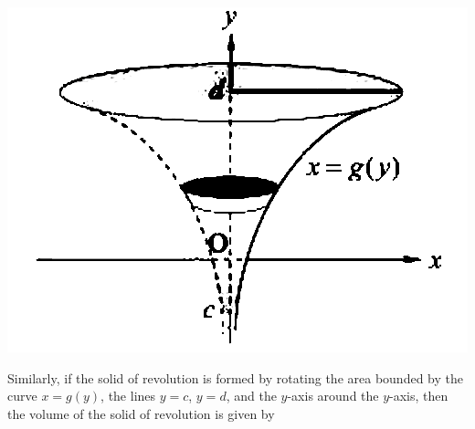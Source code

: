     \begin{center}
        \includegraphics[scale=0.3]{assets/28-23.png}
    \end{center}

    Similarly, if the solid of revolution is formed by rotating the area bounded by
    the curve $x = g(y)$, the lines $y = c$, $y = d$, and the $y$-axis around the
$y$-axis, then the volume of the solid of revolution is given by
    \begin{center}
    \end{center}

    \newpage
    

